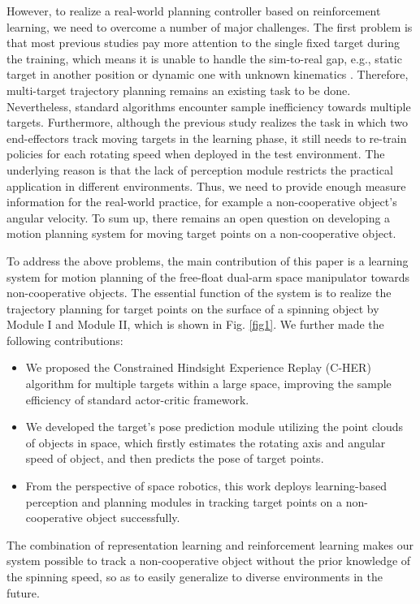 \documentclass{article}
\begin{document}
However, to realize a real-world planning controller based on reinforcement learning, we need to overcome a number of major challenges. The first problem is that most previous studies pay more attention to the single fixed target during the training, which means it is unable to handle the sim-to-real gap, e.g., static target in another position or dynamic one with unknown kinematics \cite{yan2018control,2020Reinforcement,li2021constrained}. Therefore, multi-target trajectory planning remains an existing task to be done. Nevertheless, standard algorithms encounter sample inefficiency towards multiple targets. Furthermore, although the previous study realizes the task in which two end-effectors track moving targets in the learning phase, it still needs to re-train policies for each rotating speed \cite{li2021constrained} when deployed in the test environment. The underlying reason is that the lack of perception module restricts the practical application in different environments. Thus, we need to provide enough measure information for the real-world practice, for example a non-cooperative object's angular velocity. To sum up, there remains an open question on developing a motion planning system for moving target points on a non-cooperative object. 


To address the above problems, the main contribution of this paper is a learning system for motion planning of the free-float dual-arm space manipulator towards non-cooperative objects. The essential function of the system is to realize the trajectory planning for target points on the surface of a spinning object by Module I and Module II, which is shown in Fig. \ref{fig1}. We further made the following contributions:
\begin{itemize}
\item We proposed the Constrained Hindsight Experience Replay (C-HER) algorithm for multiple targets within a large space, improving the sample efficiency of standard actor-critic framework. 
\item We developed the target's pose prediction module utilizing the point clouds of objects in space, which firstly estimates the rotating axis and angular speed of object, and then predicts the pose of target points.
\item From the perspective of space robotics, this work deploys learning-based perception and planning modules in tracking target points on a non-cooperative object successfully.
\end{itemize}
The combination of representation learning and reinforcement learning makes our system possible to track a non-cooperative object without the prior knowledge of the spinning speed, so as to easily generalize to diverse environments in the future. 
\end{document}
